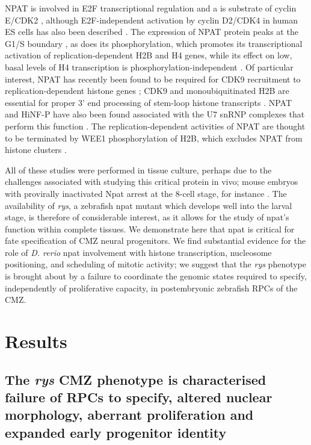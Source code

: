 NPAT is involved in E2F transcriptional regulation \cite{Gao2003} and a is substrate of cyclin E/CDK2 \cite{Zhao1998}, although E2F-independent activation by cyclin D2/CDK4 in human ES cells has also been described \cite{Becker2010}. The expression of NPAT protein peaks at the G1/S boundary \cite{Zhao1998}, as does its phosphorylation, which promotes its transcriptional activation of replication-dependent H2B \cite{Ma2000} and H4 \cite{Mitra2009} genes, while its effect on low, basal levels of H4 transcription is phosphorylation-independent \cite{Ye2003}. Of particular interest, NPAT has recently been found to be required for CDK9 recruitment to replication-dependent histone genes \cite{Pirngruber2010}; CDK9 and monoubiquitinated H2B are essential for proper 3’ end processing of stem-loop histone transcripts \cite{Pirngruber2009}. NPAT and HiNF-P have also been found associated with the U7 snRNP complexes that perform this function \cite{Ghule2009}. The replication-dependent activities of NPAT are thought to be terminated by WEE1 phosphorylation of H2B, which excludes NPAT from histone clusters \cite{Mahajan2012}.

All of these studies were performed in tissue culture, perhaps due to the challenges associated with studying this critical protein in vivo; mouse embryos with provirally inactivated Npat arrest at the 8-cell stage, for instance \cite{DiFruscio1997}. The availability of \textit{rys}, a zebrafish npat mutant which develops well into the larval stage, is therefore of considerable interest, as it allows for the study of npat’s function within complete tissues. We demonstrate here that npat is critical for fate specification of CMZ neural progenitors. We find substantial evidence for the role of \textit{D. rerio} npat involvement with histone transcription, nucleosome positioning, and scheduling of mitotic activity; we suggest that the \textit{rys} phenotype is brought about by a failure to coordinate the genomic states required to specify, independently of proliferative capacity, in postembryonic zebrafish RPCs of the CMZ.

\section{Results}
\subsection{The \textit{rys} CMZ phenotype is characterised failure of RPCs to specify, altered nuclear morphology, aberrant proliferation and expanded early progenitor identity}

